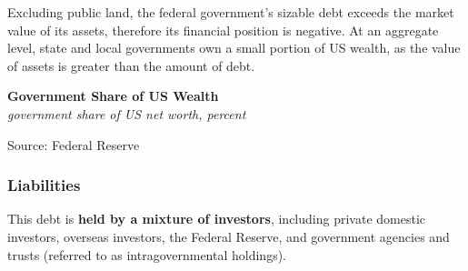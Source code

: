 \documentclass{report}
\makeatletter
\newcommand{\tbllink}[1]{\href{https://raw.githubusercontent.com/bdecon/US-chartbook/master/chartbook/data/#1}{\faTable}}
\newcommand*\short[1]{\expandafter\@gobbletwo\number\numexpr#1\relax}
\newcommand{\absnode}[3]{\node[below right, align=left] at (axis cs: #1,#2) {#3};}
\newcommand{\shdateaxisticks}{
		date coordinates in=x, axis line style={draw=none},
		xmax={2024-01-31},
		max space between ticks=40,	    
		xtick={{1990-01-01}, {1995-01-01}, {2000-01-01}, 
			{2005-01-01}, {2010-01-01}, {2015-01-01}, {2020-01-01}},
		minor xtick={},
		enlarge y limits={0.06}, enlarge x limits={0.01},
		xticklabel style={align=center, yshift=-2pt}, tick label style={inner sep=0pt},
		}
\newcommand{\bbar}[2]{extra #1 ticks = {{#2}}, extra #1 tick labels = ,
		extra #1 tick style = {grid=major, grid style={thick, black!25}},}
\newcommand{\thickline}[4]{\addplot[ultra thick, no markers, color=#1] 
		table [x=#2, y=#3, col sep=comma] {#4};	}
\newcommand{\rbars}{
		\fill[color=black!10] (axis cs:{1990-07-01},\pgfkeysvalueof{/pgfplots/ymin})
			rectangle (axis cs:{1991-03-01}, \pgfkeysvalueof{/pgfplots/ymax});
		\fill[color=black!10] (axis cs:{2007-12-01},\pgfkeysvalueof{/pgfplots/ymin})
			rectangle (axis cs:{2009-07-01}, \pgfkeysvalueof{/pgfplots/ymax});
		\fill[color=black!10] (axis cs:{2001-03-01},\pgfkeysvalueof{/pgfplots/ymin})
			rectangle (axis cs:{2001-11-01}, \pgfkeysvalueof{/pgfplots/ymax});
		\fill[color=black!10] (axis cs:{2020-02-01},\pgfkeysvalueof{/pgfplots/ymin})
			rectangle (axis cs:{2020-05-01}, \pgfkeysvalueof{/pgfplots/ymax});}
\makeatother
\begin{document}
{\begin{minipage}{1.0\textwidth}
Excluding public land, the federal government's sizable debt exceeds the market value of its assets, therefore its financial position is negative. At an aggregate level, state and local governments own a small portion of US wealth, as the value of assets is greater than the amount of debt. 
\end{minipage}

\begin{minipage}{0.48\textwidth}
\normalsize \textbf{Government Share of US Wealth}\\
\footnotesize{\textit{government share of US net worth, percent}}
\vspace{2.95cm}

\hspace{3mm} 

\footnotesize{Source: Federal Reserve} \hfill \tbllink{govshnw.csv}
\end{minipage} \hspace{5mm} \begin{minipage}{0.235\textwidth}
\small 
\end{minipage}
\newpage
\begin{minipage}{1.0\textwidth}   
\subsubsection*{Liabilities}
\small  This debt is \textbf{held by a mixture of investors}, including private domestic investors, overseas investors, the Federal Reserve, and government agencies and trusts (referred to as intragovernmental holdings). 


\end{minipage}}
\end{document}
